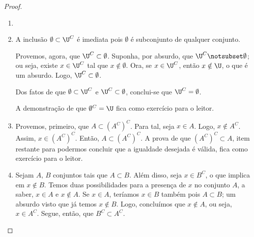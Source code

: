 \begin{proof}
\begin{enumerate}
\item[]
\item A inclusão $\emptyset \subset \U^C$ é imediata pois $\emptyset$ é subconjunto de qualquer conjunto. 

Provemos, agora, que $\U^C \subset \emptyset$. Suponha, por absurdo, que $\U^C \notsubset \emptyset$; ou seja, existe $x \in \U^C$ tal que $x \notin \emptyset$. Ora, se $x \in \U^C$, então $x \notin \U$, o que é um absurdo. Logo, $\U^C \subset \emptyset$.

Dos fatos de que $\emptyset \subset \U^C$ e $\U^C \subset \emptyset$, conclui-se que $\U^C = \emptyset$.

A demonstração de que $\emptyset^C = \U$ fica como exercício para o leitor.

\item Provemos, primeiro, que $A \subset (A^C)^C$. Para tal, seja $x \in A$. Logo, $x \notin A^C$. Assim, $x \in (A^C)^C$. Então, $A \subset (A^C)^C$. A prova de que $(A^C)^C \subset A$, item restante para podermos concluir que a igualdade desejada é válida, fica como exercício para o leitor.

\item Sejam $A$, $B$ conjuntos tais que $A \subset B$. Além disso, seja $x \in B^C$, o que implica em $x \notin B$. Temos duas possibilidades para a presença de $x$ no conjunto $A$, a saber, $x \in A$ e $x \notin A$. Se $x \in A$, teríamos $x \in B$ também pois $A \subset B$; um absurdo visto que já temos $x \notin B$. Logo, concluímos que $x \notin A$, ou seja, $x \in A^C$. Segue, então, que $B^C \subset A^C$.
\end{enumerate}
\end{proof}


